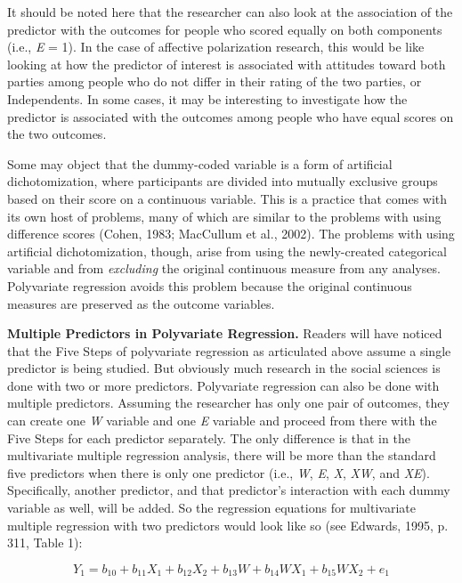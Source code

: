 \documentclass[authordate, meta, issue]{jote-new-article}
\begin{document}
	It should be noted here that the researcher can also look at the association of the predictor with the outcomes for people who scored equally on both components (i.e., \emph{E} = 1). In the case of affective polarization research, this would be like looking at how the predictor of interest is associated with attitudes toward both parties among people who do not differ in their rating of the two parties, or Independents. In some cases, it may be interesting to investigate how the predictor is associated with the outcomes among people who have equal scores on the two outcomes.



	Some may object that the dummy-coded variable is a form of artificial dichotomization, where participants are divided into mutually exclusive groups based on their score on a continuous variable. This is a practice that comes with its own host of problems, many of which are similar to the problems with using difference scores (Cohen, 1983; MacCullum et al., 2002). The problems with using artificial dichotomization, though, arise from using the newly-created categorical variable and from \emph{excluding} the original continuous measure from any analyses. Polyvariate regression avoids this problem because the original continuous measures are preserved as the outcome variables.



	\textbf{Multiple Predictors in Polyvariate Regression.} Readers will have noticed that the Five Steps of polyvariate regression as articulated above assume a single predictor is being studied. But obviously much research in the social sciences is done with two or more predictors. Polyvariate regression can also be done with multiple predictors. Assuming the researcher has only one pair of outcomes, they can create one \emph{W} variable and one \emph{E} variable and proceed from there with the Five Steps for each predictor separately. The only difference is that in the multivariate multiple regression analysis, there will be more than the standard five predictors when there is only one predictor (i.e., \emph{W}, \emph{E}, \emph{X}, \emph{XW}, and \emph{XE}). Specifically, another predictor, and that predictor's interaction with each dummy variable as well, will be added. So the regression equations for multivariate multiple regression with two predictors would look like so (see Edwards, 1995, p. 311, Table 1):



	\begin{equation}
		Y_1= b_{10}+b_{11}X_1+b_{12}X_2+b_{13}W+b_{14}WX_1+b_{15}WX_2+e_1
	\end{equation}
\end{document}
